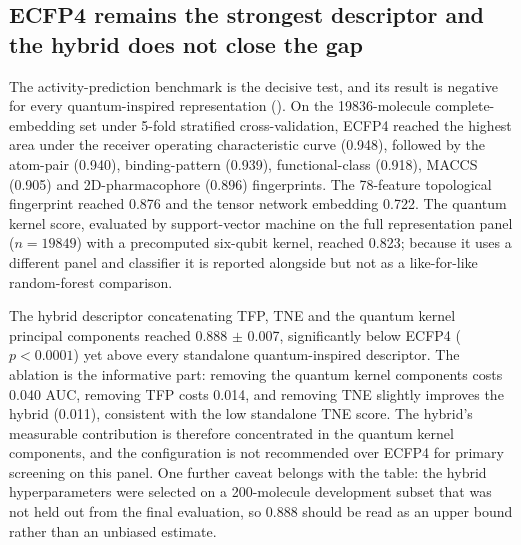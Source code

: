 \subsection{ECFP4 remains the strongest descriptor and the hybrid does not close the gap}

The activity-prediction benchmark is the decisive test, and its result is negative for every quantum-inspired representation (). On the \num{19836}-molecule complete-embedding set under 5-fold stratified cross-validation, ECFP4 reached the highest area under the receiver operating characteristic curve (\num{0.948}), followed by the atom-pair (\num{0.940}), binding-pattern (\num{0.939}), functional-class (\num{0.918}), MACCS (\num{0.905}) and 2D-pharmacophore (\num{0.896}) fingerprints. The \num{78}-feature topological fingerprint reached \num{0.876} and the tensor network embedding \num{0.722}. The quantum kernel score, evaluated by support-vector machine on the full representation panel ($n = \num{19849}$) with a precomputed six-qubit kernel, reached \num{0.823}; because it uses a different panel and classifier it is reported alongside but not as a like-for-like random-forest comparison.

The hybrid descriptor concatenating TFP, TNE and the quantum kernel principal components reached \num{0.888} $\pm$ \num{0.007}, significantly below ECFP4 ($p < \num{0.0001}$) yet above every standalone quantum-inspired descriptor. The ablation is the informative part: removing the quantum kernel components costs \num{0.040} AUC, removing TFP costs \num{0.014}, and removing TNE slightly improves the hybrid (\num{+0.011}), consistent with the low standalone TNE score. The hybrid's measurable contribution is therefore concentrated in the quantum kernel components, and the configuration is not recommended over ECFP4 for primary screening on this panel. One further caveat belongs with the table: the hybrid hyperparameters were selected on a \num{200}-molecule development subset that was not held out from the final evaluation, so \num{0.888} should be read as an upper bound rather than an unbiased estimate.

